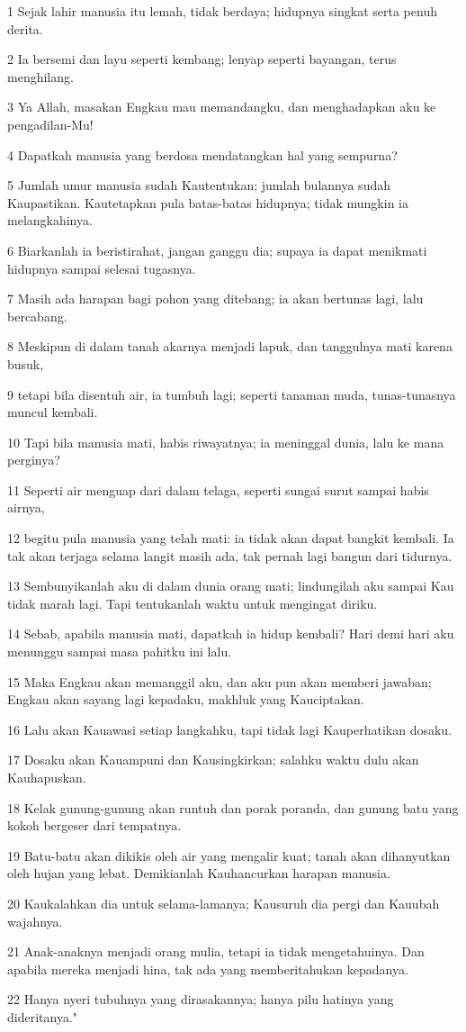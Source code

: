 \par 1 Sejak lahir manusia itu lemah, tidak berdaya; hidupnya singkat serta penuh derita.
\par 2 Ia bersemi dan layu seperti kembang; lenyap seperti bayangan, terus menghilang.
\par 3 Ya Allah, masakan Engkau mau memandangku, dan menghadapkan aku ke pengadilan-Mu!
\par 4 Dapatkah manusia yang berdosa mendatangkan hal yang sempurna?
\par 5 Jumlah umur manusia sudah Kautentukan; jumlah bulannya sudah Kaupastikan. Kautetapkan pula batas-batas hidupnya; tidak mungkin ia melangkahinya.
\par 6 Biarkanlah ia beristirahat, jangan ganggu dia; supaya ia dapat menikmati hidupnya sampai selesai tugasnya.
\par 7 Masih ada harapan bagi pohon yang ditebang; ia akan bertunas lagi, lalu bercabang.
\par 8 Meskipun di dalam tanah akarnya menjadi lapuk, dan tanggulnya mati karena busuk,
\par 9 tetapi bila disentuh air, ia tumbuh lagi; seperti tanaman muda, tunas-tunasnya muncul kembali.
\par 10 Tapi bila manusia mati, habis riwayatnya; ia meninggal dunia, lalu ke mana perginya?
\par 11 Seperti air menguap dari dalam telaga, seperti sungai surut sampai habis airnya,
\par 12 begitu pula manusia yang telah mati: ia tidak akan dapat bangkit kembali. Ia tak akan terjaga selama langit masih ada, tak pernah lagi bangun dari tidurnya.
\par 13 Sembunyikanlah aku di dalam dunia orang mati; lindungilah aku sampai Kau tidak marah lagi. Tapi tentukanlah waktu untuk mengingat diriku.
\par 14 Sebab, apabila manusia mati, dapatkah ia hidup kembali? Hari demi hari aku menunggu sampai masa pahitku ini lalu.
\par 15 Maka Engkau akan memanggil aku, dan aku pun akan memberi jawaban; Engkau akan sayang lagi kepadaku, makhluk yang Kauciptakan.
\par 16 Lalu akan Kauawasi setiap langkahku, tapi tidak lagi Kauperhatikan dosaku.
\par 17 Dosaku akan Kauampuni dan Kausingkirkan; salahku waktu dulu akan Kauhapuskan.
\par 18 Kelak gunung-gunung akan runtuh dan porak poranda, dan gunung batu yang kokoh bergeser dari tempatnya.
\par 19 Batu-batu akan dikikis oleh air yang mengalir kuat; tanah akan dihanyutkan oleh hujan yang lebat. Demikianlah Kauhancurkan harapan manusia.
\par 20 Kaukalahkan dia untuk selama-lamanya; Kausuruh dia pergi dan Kauubah wajahnya.
\par 21 Anak-anaknya menjadi orang mulia, tetapi ia tidak mengetahuinya. Dan apabila mereka menjadi hina, tak ada yang memberitahukan kepadanya.
\par 22 Hanya nyeri tubuhnya yang dirasakannya; hanya pilu hatinya yang dideritanya."

